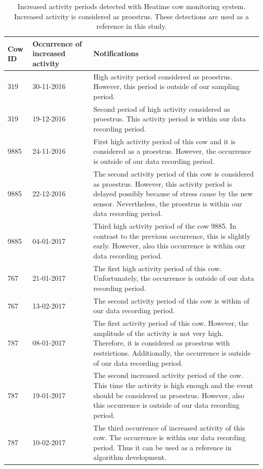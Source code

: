 \documentclass[english,12pt,a4paper,pdftex,elec,utf8]{aaltothesis}
\begin{document}
\begin{table} \caption{Increased activity periods detected with Heatime cow monitoring system. Increased activity is considered as proestrus. These detections are used as a reference in this study.} \label{fullestrustable}
\centering
\begin{tabular}{| p{1.25cm} | p{2.25cm} | p{9 cm} |}
\hline
\textbf{Cow ID} & \textbf{Occurrence of increased activity} & \textbf{Notifications} \\  \hline
319 & 30-11-2016 & High activity period considered as proestrus. However, this period is outside of our sampling period. \\ \hline
319 & 19-12-2016 &  Second period of high activity considered as proestrus. This activity period is within our data recording period.  \\ \hline
9885 & 24-11-2016 & First high activity period of this cow and it is considered as a proestrus. However, the occurrence is outside of our data recording period.  \\ \hline
9885  & 22-12-2016  & The second activity period of this cow is considered as proestrus. However, this activity period is delayed possibly because of stress cause by the new sensor. Nevertheless, the proestrus is within our data recording period.  \\ \hline
9885  & 04-01-2017  & Third high activity period of the cow 9885. In contrast to the previous occurrence, this is slightly early. However, also this occurrence is within our data recording period.  \\ \hline
 767 &  21-01-2017 & The first high activity period of this cow. Unfortunately, the occurrence is outside of our data recording period.  \\ \hline
 767 & 13-02-2017  & The second activity period of this cow is within of our data recording period.  \\ \hline
 787 & 08-01-2017 &  The first activity period of this cow. However, the amplitude of the activity is not very high. Therefore, it is considered as proestrus with restrictions. Additionally, the occurrence is outside of our data recording period. \\ \hline
 787 & 19-01-2017  & The second increased activity period of the cow. This time the activity is high enough and the event should be considered as proestrus. However, also this occurrence is outside of our data recording period.  \\ \hline
 787 & 10-02-2017  &  The third occurrence of increased activity of this cow. The occurrence is within our data recording period. Thus it can be used as a reference in algorithm development. \\ \hline
\end{tabular}
\end{table}
\end{document}
